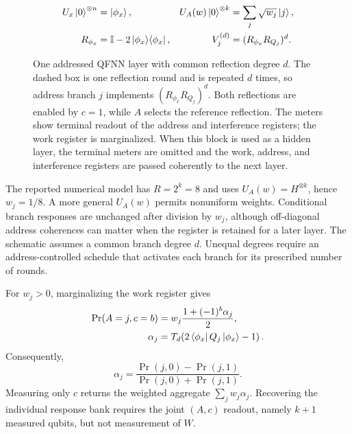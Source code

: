 \documentclass[pdflatex,sn-mathphys,NameDate,iicol]{sn-jnl}
\newcommand{\id}{\mathbb{I}}
\newcommand{\proj}[1]{\ket{#1}\!\bra{#1}}
\begin{document}
\begin{figure}[t]
\centering
{}%
\vspace{1mm}
\begin{align*}
 U_x\ket{0}^{\otimes n}&=\ket{\phi_x},
 &
 U_A(w)\ket{0}^{\otimes k}&=\sum_j\sqrt{w_j}\ket j,
 \\
 R_{\phi_x}&=\id-2\proj{\phi_x},
 &
 V_j^{(d)}&=(R_{\phi_x}R_{Q_j})^d.
\end{align*}
\caption{One addressed QFNN layer with common reflection degree $d$. The
dashed box is one reflection round and is repeated $d$ times, so address
branch $j$ implements $(R_{\phi_x}R_{Q_j})^d$. Both reflections are enabled
by $c=1$, while $A$ selects the reference reflection. The meters show terminal
readout of the address and interference registers; the work register is
marginalized. When this block is used as a hidden layer, the terminal meters
are omitted and the work, address, and interference registers are passed
coherently to the next layer.}
\label{fig:qfnn-one-layer}
\end{figure}

The reported numerical model has $R=2^k=8$ and uses
$U_A(w)=H^{\otimes k}$, hence $w_j=1/8$. A more general $U_A(w)$ permits
nonuniform weights. Conditional branch responses are unchanged after division
by $w_j$, although off-diagonal address coherences can matter when the register
is retained for a later layer. The schematic assumes a common branch degree
$d$. Unequal degrees require an address-controlled schedule that activates
each branch for its prescribed number of rounds.

For $w_j>0$, marginalizing the work register gives
\begin{align}
 \Pr(A=j,c=b)
 &=w_j\frac{1+(-1)^b\alpha_j}{2},
 \\
 \alpha_j
 &=T_d\!\left(2\bra{\phi_x}Q_j\ket{\phi_x}-1\right).
 \label{eq:app-one-layer-joint-probability}
\end{align}
Consequently,
\begin{equation}
 \alpha_j
 =\frac{\Pr(j,0)-\Pr(j,1)}{\Pr(j,0)+\Pr(j,1)}.
 \label{eq:app-one-layer-extraction}
\end{equation}
Measuring only $c$ returns the weighted aggregate
$\sum_jw_j\alpha_j$. Recovering the individual response bank requires the
joint $(A,c)$ readout, namely $k+1$ measured qubits, but not measurement of
$W$.
\end{document}
